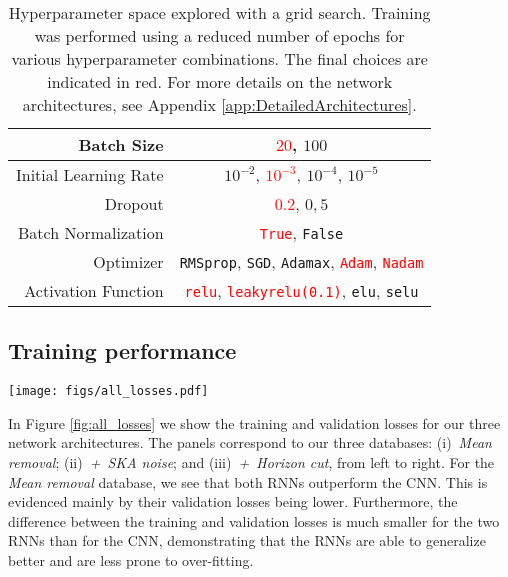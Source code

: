 \documentclass[fleqn,usenatbib]{mnras}
\begin{document}
\begin{table}
\centering
\begin{tabular}{|r|c|} 
 \hline
 Batch Size & \textcolor{red}{$20$}, $100$ \\
 \hline
 Initial Learning Rate & $10^{-2}$, \textcolor{red}{$10^{-3}$}, $10^{-4}$, $10^{-5}$ \\
 \hline
 Dropout & \textcolor{red}{$0.2$}, $0,5$ \\
 \hline
 Batch Normalization & \textcolor{red}{\texttt{True}}, \texttt{False} \\
 \hline
 Optimizer & \texttt{RMSprop}, \texttt{SGD}, \texttt{Adamax}, \textcolor{red}{\texttt{Adam}}, \textcolor{red}{\texttt{Nadam}} \\
 \hline
 Activation Function & \textcolor{red}{\texttt{relu}}, \textcolor{red}{\texttt{leakyrelu(0.1)}}, \texttt{elu}, \texttt{selu} \\
 \hline
\end{tabular}
\caption{Hyperparameter space explored with a grid search.  Training was performed using a reduced number of epochs for various hyperparameter combinations. The final choices are indicated in red.  For more details on the network architectures, see Appendix \ref{app:DetailedArchitectures}.}
\label{table:hyperaparams}
\end{table}


\subsection{Training performance} \label{subsec:training_performance}

\begin{figure*}
    \centering
    \texttt{[image: figs/all\_losses.pdf]}
    \caption{Training and validation losses for the final NN architectures.  CNN, ConvRNN and SummaryRNN architectures are depicted in orange, purple and blue, respectively.  The panels correspond to our three databases, from left to right in increasing levels of signal contamination. ConvRNN converges extremely quickly and we train it for 200 epochs only (dashed lines denote the final loss after 200 epochs). The other NNs were trained for 1000 epochs.}
    \label{fig:all_losses}
\end{figure*}

In Figure \ref{fig:all_losses} we show the training and validation losses for our three network architectures.  The panels correspond to our three databases: (i)~{\it Mean removal}; (ii)~{\it +~SKA noise}; and (iii)~{\it +~Horizon cut}, from left to right.  For the {\it Mean removal} database, we see that both RNNs outperform the CNN.  This is evidenced mainly by their validation losses being lower.  Furthermore, the difference between the training and validation losses is much smaller for the two RNNs than for the CNN, demonstrating that the RNNs are able to generalize better and are less prone to over-fitting. 
\end{document}
